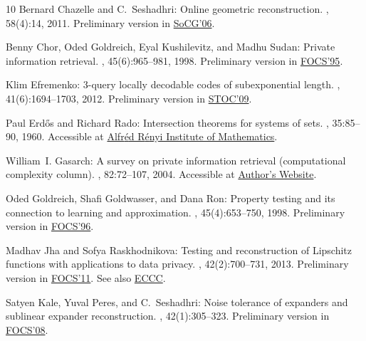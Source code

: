 \begin{thebibliography}{10}
{\sc Bernard Chazelle and C.~Seshadhri}: Online geometric reconstruction.
, 58(4):14, 2011.
\newblock Preliminary version in
  \href{http://dx.doi.org/10.1145/1137856.1137912}{SoCG'06}.
\newblock [\epfmtdoi{10.1145/1989727.1989728}]

{\sc Benny Chor, Oded Goldreich, Eyal Kushilevitz, and Madhu Sudan}: Private
  information retrieval.
, 45(6):965--981, 1998.
\newblock Preliminary version in
  \href{http://dx.doi.org/10.1109/SFCS.1995.492461}{FOCS'95}.
\newblock [\epfmtdoi{10.1145/293347.293350}]

{\sc Klim Efremenko}: 3-query locally decodable codes of subexponential length.
, 41(6):1694--1703, 2012.
\newblock Preliminary version in
  \href{http://dx.doi.org/10.1145/1536414.1536422}{STOC'09}.
\newblock [\epfmtdoi{10.1137/090772721}]

{\sc Paul Erd{\H{o}}s and Richard Rado}: Intersection theorems for systems of
  sets.
, 35:85--90, 1960.
\newblock Accessible at
  \href{https://www.renyi.hu/~p_erdos/1960-04.pdf}{Alfr{\'{e}}d R{\'{e}}nyi
  Institute of Mathematics}.

{\sc William~I. Gasarch}: A survey on private information retrieval
  (computational complexity column).
, 82:72--107, 2004.
\newblock Accessible at
  \href{http://www.cs.umd.edu/~gasarch/papers/pirsurvey.pdf}{Author's Website}.

{\sc Oded Goldreich, Shafi Goldwasser, and Dana Ron}: Property testing and its
  connection to learning and approximation.
, 45(4):653--750, 1998.
\newblock Preliminary version in
  \href{http://dx.doi.org/10.1109/SFCS.1996.548493}{FOCS'96}.
\newblock [\epfmtdoi{10.1145/285055.285060}]

{\sc Madhav Jha and Sofya Raskhodnikova}: Testing and reconstruction of
  {L}ipschitz functions with applications to data privacy.
, 42(2):700--731, 2013.
\newblock Preliminary version in
  \href{http://dx.doi.org/10.1109/FOCS.2011.13}{FOCS'11}. See also
  \href{http://eccc.hpi-web.de/report/2011/057}{ECCC}.
\newblock [\epfmtdoi{10.1137/110840741}]

{\sc Satyen Kale, Yuval Peres, and C.~Seshadhri}: Noise tolerance of expanders
  and sublinear expander reconstruction.
, 42(1):305--323.
\newblock Preliminary version in
  \href{http://dx.doi.org/10.1109/FOCS.2008.65}{FOCS'08}.
\newblock [\epfmtdoi{10.1137/110837863}]


\end{thebibliography}
